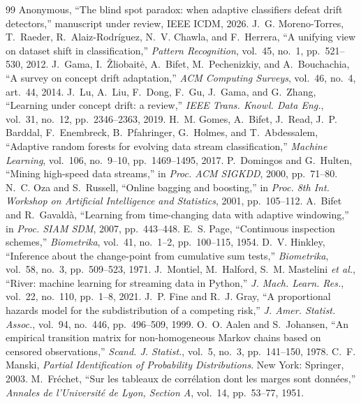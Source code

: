 \documentclass[10pt,conference]{IEEEtran}
\theoremstyle{definition}
\begin{document}
\begin{thebibliography}{99}
\setlength{\itemsep}{0pt}
\small
{} Anonymous, ``The blind spot paradox: when adaptive classifiers defeat drift detectors,'' manuscript under review, IEEE ICDM, 2026.
 J.~G. Moreno-Torres, T.~Raeder, R.~Alaiz-Rodríguez, N.~V. Chawla, and F.~Herrera, ``A unifying view on dataset shift in classification,'' \emph{Pattern Recognition}, vol.~45, no.~1, pp.~521--530, 2012.
 J.~Gama, I.~Žliobaitė, A.~Bifet, M.~Pechenizkiy, and A.~Bouchachia, ``A survey on concept drift adaptation,'' \emph{ACM Computing Surveys}, vol.~46, no.~4, art.~44, 2014.
 J.~Lu, A.~Liu, F.~Dong, F.~Gu, J.~Gama, and G.~Zhang, ``Learning under concept drift: a review,'' \emph{IEEE Trans. Knowl. Data Eng.}, vol.~31, no.~12, pp.~2346--2363, 2019.
 H.~M. Gomes, A.~Bifet, J.~Read, J.~P. Barddal, F.~Enembreck, B.~Pfahringer, G.~Holmes, and T.~Abdessalem, ``Adaptive random forests for evolving data stream classification,'' \emph{Machine Learning}, vol.~106, no.~9--10, pp.~1469--1495, 2017.
 P.~Domingos and G.~Hulten, ``Mining high-speed data streams,'' in \emph{Proc. ACM SIGKDD}, 2000, pp.~71--80.
 N.~C. Oza and S.~Russell, ``Online bagging and boosting,'' in \emph{Proc. 8th Int. Workshop on Artificial Intelligence and Statistics}, 2001, pp.~105--112.
 A.~Bifet and R.~Gavaldà, ``Learning from time-changing data with adaptive windowing,'' in \emph{Proc. SIAM SDM}, 2007, pp.~443--448.
 E.~S. Page, ``Continuous inspection schemes,'' \emph{Biometrika}, vol.~41, no.~1--2, pp.~100--115, 1954.
 D.~V. Hinkley, ``Inference about the change-point from cumulative sum tests,'' \emph{Biometrika}, vol.~58, no.~3, pp.~509--523, 1971.
 J.~Montiel, M.~Halford, S.~M. Mastelini \emph{et al.}, ``River: machine learning for streaming data in Python,'' \emph{J. Mach. Learn. Res.}, vol.~22, no.~110, pp.~1--8, 2021.
 J.~P. Fine and R.~J. Gray, ``A proportional hazards model for the subdistribution of a competing risk,'' \emph{J. Amer. Statist. Assoc.}, vol.~94, no.~446, pp.~496--509, 1999.
 O.~O. Aalen and S.~Johansen, ``An empirical transition matrix for non-homogeneous Markov chains based on censored observations,'' \emph{Scand. J. Statist.}, vol.~5, no.~3, pp.~141--150, 1978.
 C.~F. Manski, \emph{Partial Identification of Probability Distributions}. New York: Springer, 2003.
 M.~Fréchet, ``Sur les tableaux de corrélation dont les marges sont données,'' \emph{Annales de l'Université de Lyon, Section A}, vol.~14, pp.~53--77, 1951.

\end{thebibliography}
\end{document}
